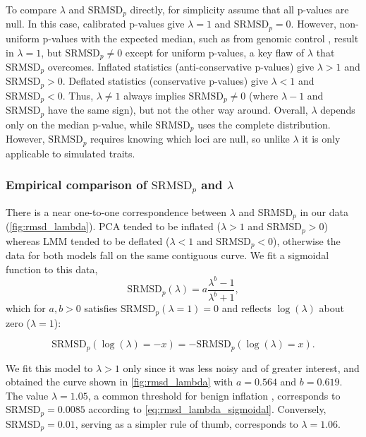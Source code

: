 \documentclass[11pt]{article}
\newcommand{\rmsd}{\text{SRMSD}_p}
\begin{document}
\begin{linenumbers}
To compare $\lambda$ and $\rmsd$ directly, for simplicity assume that all p-values are null.
In this case, calibrated p-values give $\lambda = 1$ and $\rmsd = 0$.
However, non-uniform p-values with the expected median, such as from genomic control \citep{devlin_genomic_1999}, result in $\lambda = 1$, but $\rmsd \ne 0$ except for uniform p-values, a key flaw of $\lambda$ that $\rmsd$ overcomes.
Inflated statistics (anti-conservative p-values) give $\lambda > 1$ and $\rmsd > 0$.
Deflated statistics (conservative p-values) give $\lambda < 1$ and $\rmsd < 0$.
Thus, $\lambda \ne 1$ always implies $\rmsd \ne 0$ (where $\lambda - 1$ and $\rmsd$ have the same sign), but not the other way around.
Overall, $\lambda$ depends only on the median p-value, while $\rmsd$ uses the complete distribution.
However, $\rmsd$ requires knowing which loci are null, so unlike $\lambda$ it is only applicable to simulated traits.

\subsubsection{Empirical comparison of $\rmsd$ and $\lambda$}

There is a near one-to-one correspondence between $\lambda$ and $\rmsd$ in our data (\cref{fig:rmsd_lambda}).
PCA tended to be inflated ($\lambda > 1$ and $\rmsd > 0$) whereas LMM tended to be deflated ($\lambda < 1$ and $\rmsd < 0$), otherwise the data for both models fall on the same contiguous curve.
We fit a sigmoidal function to this data,
\begin{equation}
  \label{eq:rmsd_lambda_sigmoidal}
  \rmsd( \lambda ) = a \frac{ \lambda^b - 1 }{ \lambda^b + 1 },
\end{equation}
which for $a,b > 0$ satisfies $\rmsd( \lambda = 1 ) = 0$ and reflects $\log( \lambda )$ about zero ($\lambda = 1$):
\begin{linenomath*}
$$
\rmsd( \log( \lambda ) = -x ) = - \rmsd( \log( \lambda ) = x ).
$$
\end{linenomath*}
We fit this model to $\lambda > 1$ only since it was less noisy and of greater interest, and obtained the curve shown in \cref{fig:rmsd_lambda} with $a = 0.564$ and $b = 0.619$.
The value $\lambda = 1.05$, a common threshold for benign inflation \citep{price_new_2010}, corresponds to $\rmsd = 0.0085$ according to \cref{eq:rmsd_lambda_sigmoidal}.
Conversely, $\rmsd = 0.01$, serving as a simpler rule of thumb, corresponds to $\lambda = 1.06$.


\end{linenumbers}
\end{document}
